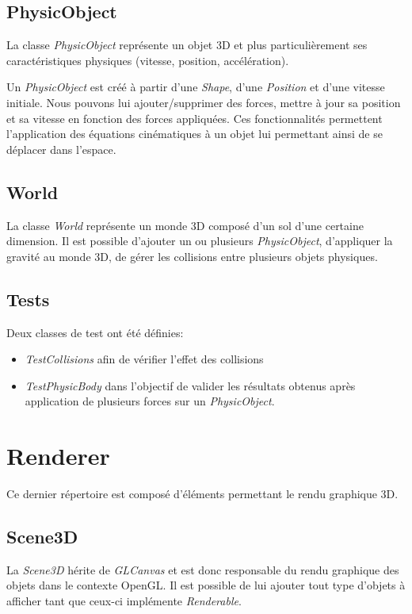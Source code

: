 \documentclass[11pt]{report}
\begin{document}
\subsection{PhysicObject}
La classe \textit{PhysicObject} représente un objet 3D et plus particulièrement ses caractéristiques physiques (vitesse, position, accélération).

Un \textit{PhysicObject} est créé à partir d'une \textit{Shape}, d'une \textit{Position} et d'une vitesse initiale.
Nous pouvons lui ajouter/supprimer des forces, mettre à jour sa position et sa vitesse en fonction des forces appliquées.
Ces fonctionnalités permettent l'application des équations cinématiques à un objet lui permettant ainsi de se déplacer dans l'espace.

\subsection{World}
La classe \textit{World} représente un monde 3D composé d'un sol d'une certaine dimension. Il est possible d'ajouter un ou plusieurs \textit{PhysicObject}, d'appliquer la gravité au monde 3D, de gérer les collisions entre plusieurs objets physiques.

\subsection{Tests}
Deux classes de test ont été définies:
\begin{itemize}
  \item \textit{TestCollisions} afin de vérifier l'effet des collisions
  \item\textit{TestPhysicBody} dans l'objectif de valider les résultats obtenus après application de plusieurs forces sur un \textit{PhysicObject}.
\end{itemize}

\section{Renderer}
Ce dernier répertoire est composé d'éléments permettant le rendu graphique 3D.

\subsection{Scene3D}

La \textit{Scene3D} hérite de \textit{GLCanvas} et est donc responsable du rendu graphique des objets dans le contexte OpenGL. Il est possible de lui ajouter tout type d'objets à afficher tant que ceux-ci implémente \textit{Renderable}.
\end{document}
